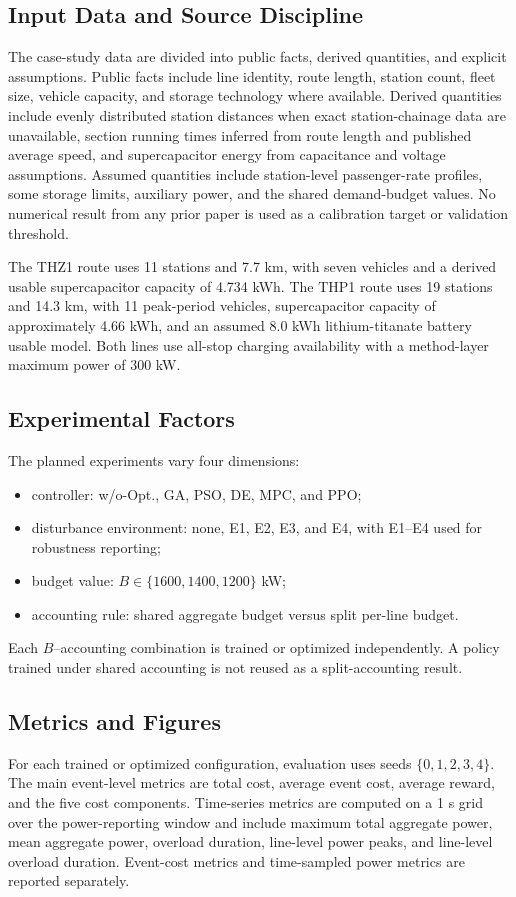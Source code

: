 \documentclass[conference]{IEEEtran}
\newcommand{\thz}{THZ1}
\newcommand{\thp}{THP1}
\begin{document}
\subsection{Input Data and Source Discipline}
The case-study data are divided into public facts, derived quantities, and explicit assumptions. Public facts include line identity, route length, station count, fleet size, vehicle capacity, and storage technology where available. Derived quantities include evenly distributed station distances when exact station-chainage data are unavailable, section running times inferred from route length and published average speed, and supercapacitor energy from capacitance and voltage assumptions. Assumed quantities include station-level passenger-rate profiles, some storage limits, auxiliary power, and the shared demand-budget values. No numerical result from any prior paper is used as a calibration target or validation threshold.

The \thz{} route uses 11 stations and 7.7 km, with seven vehicles and a derived usable supercapacitor capacity of 4.734 kWh. The \thp{} route uses 19 stations and 14.3 km, with 11 peak-period vehicles, supercapacitor capacity of approximately 4.66 kWh, and an assumed 8.0 kWh lithium-titanate battery usable model. Both lines use all-stop charging availability with a method-layer maximum power of 300 kW.

\subsection{Experimental Factors}
The planned experiments vary four dimensions:
\begin{itemize}
    \item controller: w/o-Opt., GA, PSO, DE, MPC, and PPO;
    \item disturbance environment: none, E1, E2, E3, and E4, with E1--E4 used for robustness reporting;
    \item budget value: $B \in \{1600,1400,1200\}$ kW;
    \item accounting rule: shared aggregate budget versus split per-line budget.
\end{itemize}
Each $B$--accounting combination is trained or optimized independently. A policy trained under shared accounting is not reused as a split-accounting result.

\subsection{Metrics and Figures}
For each trained or optimized configuration, evaluation uses seeds $\{0,1,2,3,4\}$. The main event-level metrics are total cost, average event cost, average reward, and the five cost components. Time-series metrics are computed on a 1 s grid over the power-reporting window and include maximum total aggregate power, mean aggregate power, overload duration, line-level power peaks, and line-level overload duration. Event-cost metrics and time-sampled power metrics are reported separately.
\end{document}
